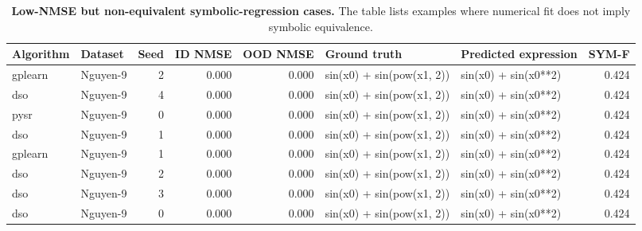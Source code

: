 \begin{table}
\caption{\textbf{Low-NMSE but non-equivalent symbolic-regression cases.} The table lists examples where numerical fit does not imply symbolic equivalence.}
\label{tab:table15_low_nmse_non_equiv_cases}
\begin{tabular}{llrrrllr}
\toprule
\textbf{Algorithm} & \textbf{Dataset} & \textbf{Seed} & \textbf{ID NMSE} & \textbf{OOD NMSE} & \textbf{Ground truth} & \textbf{Predicted expression} & \textbf{SYM-F} \\
\midrule
gplearn & Nguyen-9 & 2 & 0.000 & 0.000 & sin(x0) + sin(pow(x1, 2)) & sin(x0) + sin(x0**2) & 0.424 \\
dso & Nguyen-9 & 4 & 0.000 & 0.000 & sin(x0) + sin(pow(x1, 2)) & sin(x0) + sin(x0**2) & 0.424 \\
pysr & Nguyen-9 & 0 & 0.000 & 0.000 & sin(x0) + sin(pow(x1, 2)) & sin(x0) + sin(x0**2) & 0.424 \\
dso & Nguyen-9 & 1 & 0.000 & 0.000 & sin(x0) + sin(pow(x1, 2)) & sin(x0) + sin(x0**2) & 0.424 \\
gplearn & Nguyen-9 & 1 & 0.000 & 0.000 & sin(x0) + sin(pow(x1, 2)) & sin(x0) + sin(x0**2) & 0.424 \\
dso & Nguyen-9 & 2 & 0.000 & 0.000 & sin(x0) + sin(pow(x1, 2)) & sin(x0) + sin(x0**2) & 0.424 \\
dso & Nguyen-9 & 3 & 0.000 & 0.000 & sin(x0) + sin(pow(x1, 2)) & sin(x0) + sin(x0**2) & 0.424 \\
dso & Nguyen-9 & 0 & 0.000 & 0.000 & sin(x0) + sin(pow(x1, 2)) & sin(x0) + sin(x0**2) & 0.424 \\
\bottomrule
\end{tabular}
\end{table}
